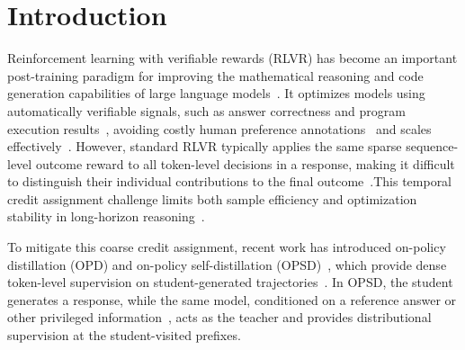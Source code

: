 \documentclass[letterpaper]{article} %
\begin{document}
\begin{links}
\end{links}


\section{Introduction}
Reinforcement learning with verifiable rewards (RLVR) has become an important post-training paradigm for improving the mathematical reasoning and code generation capabilities of large language models~\cite{lambert2024tulu3,shao2024deepseekmath,guo2025deepseekr1}. It optimizes models using automatically verifiable signals, such as answer correctness and program execution results~\cite{cobbe2021gsm8k,hendrycks2021math,chen2021codex}, avoiding costly human preference annotations~\cite{ouyang2022instructgpt,rafailov2023dpo} and scales effectively~\cite{yu2025dapo}.
However, standard RLVR typically applies the same sparse sequence-level outcome reward to all token-level decisions in a response, making it difficult to distinguish their individual contributions to the final outcome~\cite{uesato2022solving,lightman2024verify}.This temporal credit assignment challenge limits both sample efficiency and optimization stability in long-horizon reasoning~\cite{sutton1988td,kazemnejad2025vineppo,parthasarathi2025grpolambda}.

To mitigate this coarse credit assignment, recent work has introduced on-policy distillation (OPD) and on-policy self-distillation (OPSD)~\cite{agarwal2024onpolicy,gu2024minillm,zhao2026selfdistilled}, which provide dense token-level supervision on student-generated trajectories~\cite{hinton2015distilling,zelikman2022star}. In OPSD, the student generates a response, while the same model, conditioned on a reference answer or other privileged information~\cite{vapnik2009lupi,lopezpaz2016privileged}, acts as the teacher and provides distributional supervision at the student-visited prefixes.
\end{document}
